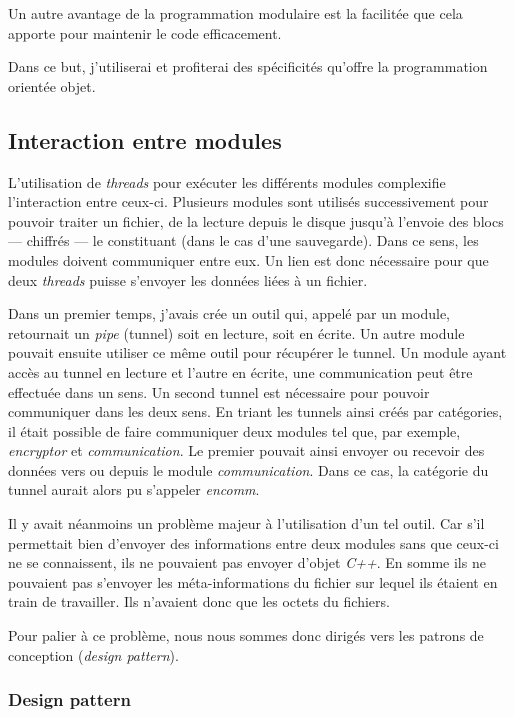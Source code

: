\documentclass[a4paper,10pt, twoside]{report}
\begin{document}
\begin{spacing}{1.2}
Un autre avantage de la programmation modulaire est la facilitée que cela
apporte pour maintenir le code efficacement.

Dans ce but, j'utiliserai et profiterai des spécificités qu'offre la
programmation orientée objet.

\subsection{Interaction entre modules}

L'utilisation de \textit{threads} pour exécuter les différents modules
complexifie l'interaction entre ceux-ci. Plusieurs modules sont utilisés
successivement pour pouvoir traiter un fichier, de la lecture depuis le disque
jusqu'à l'envoie des blocs --- chiffrés --- le constituant (dans le cas
d'une sauvegarde). Dans ce sens, les modules doivent communiquer entre eux. Un
lien est donc nécessaire pour que deux \textit{threads} puisse s'envoyer les
données liées à un fichier.

Dans un premier temps, j'avais crée un outil qui, appelé par un module,
retournait un \textit{pipe} (tunnel) soit en lecture, soit en écrite. Un autre
module pouvait ensuite utiliser ce même outil pour récupérer le tunnel.
Un module ayant accès au tunnel en lecture et l'autre en écrite, une
communication peut être effectuée dans un sens. Un second tunnel est
nécessaire pour pouvoir communiquer dans les deux sens. En triant les
tunnels ainsi créés par catégories, il était possible de faire
communiquer deux modules tel que, par exemple, \textit{encryptor} et
\textit{communication}. Le premier pouvait ainsi envoyer ou recevoir des
données vers ou depuis le module \textit{communication}. Dans ce cas, la
catégorie du tunnel aurait alors pu s'appeler \textit{encomm}.

Il y avait néanmoins un problème majeur à l'utilisation d'un tel outil.
Car s'il permettait bien d'envoyer des informations entre deux modules sans
que ceux-ci ne se connaissent, ils ne pouvaient pas envoyer d'objet
\textit{C++}. En somme ils ne pouvaient pas s'envoyer les méta-informations
du fichier sur lequel ils étaient en train de travailler. Ils n'avaient
donc que les octets du fichiers.

Pour palier à ce problème, nous nous sommes donc dirigés vers les patrons
de conception (\textit{design pattern}).

\subsubsection{Design pattern}

\end{spacing}
\end{document}
